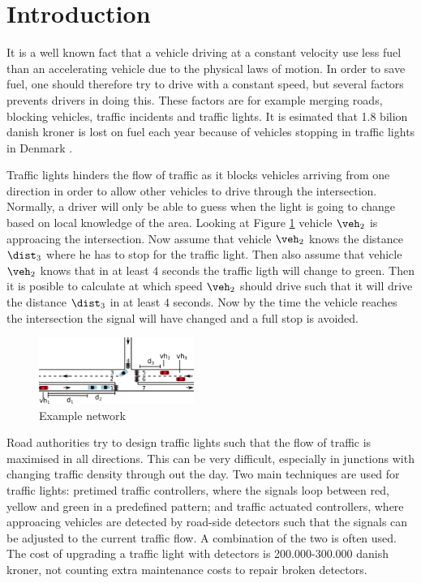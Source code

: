 \section{Introduction}
It is a well known fact that a vehicle driving at a constant velocity use less fuel than an accelerating vehicle due to the physical laws of motion\cite{Vejdir}.
In order to save fuel, one should therefore try to drive with a constant speed, but several factors prevents drivers in doing this. 
These factors are for example merging roads, blocking vehicles, traffic incidents and traffic lights. 
It is esimated that 1.8 bilion danish kroner is lost on fuel each year because of vehicles stopping in traffic lights in Denmark \cite{Vejdir}.

Traffic lights hinders the flow of traffic as it blocks vehicles arriving from one direction in order to allow other vehicles to drive through the intersection.
Normally, a driver will only be able to guess when the light is going to change based on local knowledge of the area. 
Looking at Figure \ref{fig:Introduction:network} vehicle $\veh_2$ is approacing the intersection.
Now assume that vehicle $\veh_2$ knows the distance $\dist_3$ where he has to stop for the traffic light. 
Then also assume that vehicle $\veh_2$ knows that in at least $4$ seconds the traffic ligth will change to green. 
Then it is posible to calculate at which speed $\veh_2$ should drive such that it will drive the distance $\dist_3$ in at least $4$ seconds. 
Now by the time the vehicle reaches the intersection the signal will have changed and a full stop is avoided.
\begin{figure}[htb]
\centering
\includegraphics[width=0.45\textwidth]{../images/introNetwork.png}
\caption{Example network}
\label{fig:Introduction:network}
\end{figure}

Road authorities try to design traffic lights such that the flow of traffic is maximised in all directions.
This can be very difficult, especially in junctions with changing traffic density through out the day.
Two main techniques are used for traffic lights: pretimed traffic controllers, where the signals loop between red, yellow and green in a predefined pattern; and traffic actuated controllers, where approacing vehicles are detected by road-side detectors such that the signals can be adjusted to the current traffic flow.
A combination of the two is often used.
The cost of upgrading a traffic light with detectors is 200.000-300.000 danish kroner, not counting extra maintenance costs to repair broken detectors\cite{Vejdir}.

